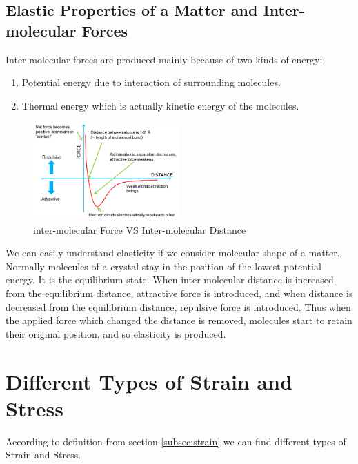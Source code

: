 \documentclass{article}
\begin{document}
    \subsection{Elastic Properties of a Matter and Inter-molecular Forces}
        Inter-molecular forces are produced mainly because of two kinds of energy:
        
        \begin{enumerate}
            \item Potential energy due to interaction of surrounding molecules.
            \item Thermal energy which is actually kinetic energy of the molecules.
        \end{enumerate}
        
        \begin{figure}
            \centering
            \includegraphics[width=0.5\textwidth]{Figures/ForceVsDistance.jpg}
            \caption{inter-molecular Force VS Inter-molecular Distance}
        \end{figure}    
            
        We can easily understand elasticity if we consider molecular shape of a matter. Normally molecules of a crystal stay in the position of the lowest potential energy. It is the equilibrium state. When inter-molecular distance is increased from the equilibrium distance, attractive force is introduced, and when distance is decreased from the equilibrium distance, repulsive force is introduced. Thus when the applied force which changed the distance is removed, molecules start to retain their original position, and so elasticity is produced.
        
\section{Different Types of Strain and Stress}
    According to definition from section \ref{subsec:strain} we can find different types of Strain and Stress.
    
\end{document}
